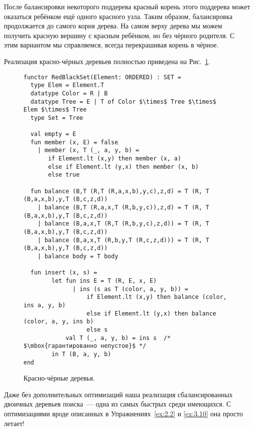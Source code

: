 После балансировки некоторого поддерева красный корень этого поддерева
может оказаться ребёнком ещё одного красного узла. Таким образом,
балансировка продолжается до самого корня дерева. На самом верху
дерева мы можем получить красную вершину с красным ребёнком, но без
чёрного родителя. С этим вариантом мы справляемся, всегда перекрашивая корень
в чёрное.

Реализация красно-чёрных деревьев полностью приведена на Рис.~\ref{fig:3.6}.

\begin{figure}
\begin{lstlisting}
functor RedBlackSet(Element: ORDERED) : SET =
  type Elem = Element.T
  datatype Color = R | B
  datatype Tree = E | T of Color $\times$ Tree $\times$ Elem $\times$ Tree
  type Set = Tree

  val empty = E
  fun member (x, E) = false
    | member (x, T (_, a, y, b) =
       if Element.lt (x,y) then member (x, a)
       else if Element.lt (y,x) then member (x, b)
       else true

  fun balance (B,T (R,T (R,a,x,b),y,c),z,d) = T (R, T (B,a,x,b),y,T (B,c,z,d))
    | balance (B,T (R,a,x,T (R,b,y,c)),z,d) = T (R, T (B,a,x,b),y,T (B,c,z,d))
    | balance (B,a,x,T (R,T (R,b,y,c),z,d)) = T (R, T (B,a,x,b),y,T (B,c,z,d))
    | balance (B,a,x,T (R,b,y,T (R,c,z,d))) = T (R, T (B,a,x,b),y,T (B,c,z,d))
    | balance body = T body

  fun insert (x, s) =
        let fun ins E = T (R, E, x, E)
              | ins (s as T (color, a, y, b)) =
                  if Element.lt (x,y) then balance (color, ins a, y, b)
                  else if Element.lt (y,x) then balance (color, a, y, ins b)
                  else s
            val T (_, a, y, b) = ins s  /* $\mbox{гарантированно непустое}$ */
        in T (B, a, y, b)
end
\end{lstlisting}

  \caption{Красно-чёрные деревья.}
  \label{fig:3.6}
\end{figure}

\begin{hint}
  Даже без дополнительных оптимизаций наша реализация сбалансированных
  двоичных деревьев поиска~--- одна из самых быстрых среди
  имеющихся. С оптимизациями вроде описанных в
  Упражнениях~\ref{ex:2.2} и \ref{ex:3.10} она просто летает!
\end{hint}

